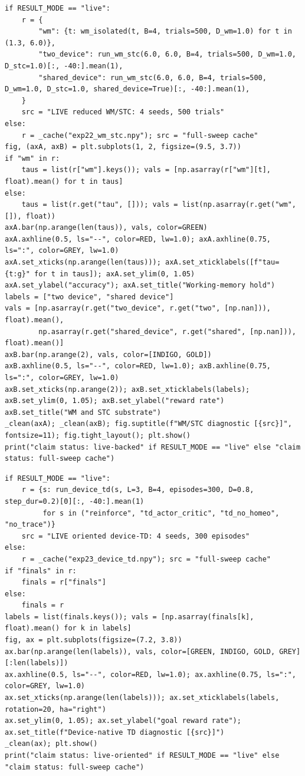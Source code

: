 \begin{lstlisting}[caption={06\_extensions.ipynb code cell 4},label={lst:mrl-nb-06-extensions-4}]
if RESULT_MODE == "live":
    r = {
        "wm": {t: wm_isolated(t, B=4, trials=500, D_wm=1.0) for t in (1.3, 6.0)},
        "two_device": run_wm_stc(6.0, 6.0, B=4, trials=500, D_wm=1.0, D_stc=1.0)[:, -40:].mean(1),
        "shared_device": run_wm_stc(6.0, 6.0, B=4, trials=500, D_wm=1.0, D_stc=1.0, shared_device=True)[:, -40:].mean(1),
    }
    src = "LIVE reduced WM/STC: 4 seeds, 500 trials"
else:
    r = _cache("exp22_wm_stc.npy"); src = "full-sweep cache"
fig, (axA, axB) = plt.subplots(1, 2, figsize=(9.5, 3.7))
if "wm" in r:
    taus = list(r["wm"].keys()); vals = [np.asarray(r["wm"][t], float).mean() for t in taus]
else:
    taus = list(r.get("tau", [])); vals = list(np.asarray(r.get("wm", []), float))
axA.bar(np.arange(len(taus)), vals, color=GREEN)
axA.axhline(0.5, ls="--", color=RED, lw=1.0); axA.axhline(0.75, ls=":", color=GREY, lw=1.0)
axA.set_xticks(np.arange(len(taus))); axA.set_xticklabels([f"tau={t:g}" for t in taus]); axA.set_ylim(0, 1.05)
axA.set_ylabel("accuracy"); axA.set_title("Working-memory hold")
labels = ["two device", "shared device"]
vals = [np.asarray(r.get("two_device", r.get("two", [np.nan])), float).mean(),
        np.asarray(r.get("shared_device", r.get("shared", [np.nan])), float).mean()]
axB.bar(np.arange(2), vals, color=[INDIGO, GOLD])
axB.axhline(0.5, ls="--", color=RED, lw=1.0); axB.axhline(0.75, ls=":", color=GREY, lw=1.0)
axB.set_xticks(np.arange(2)); axB.set_xticklabels(labels); axB.set_ylim(0, 1.05); axB.set_ylabel("reward rate")
axB.set_title("WM and STC substrate")
_clean(axA); _clean(axB); fig.suptitle(f"WM/STC diagnostic [{src}]", fontsize=11); fig.tight_layout(); plt.show()
print("claim status: live-backed" if RESULT_MODE == "live" else "claim status: full-sweep cache")
\end{lstlisting}

\begin{lstlisting}[caption={06\_extensions.ipynb code cell 5},label={lst:mrl-nb-06-extensions-5}]
if RESULT_MODE == "live":
    r = {s: run_device_td(s, L=3, B=4, episodes=300, D=0.8, step_dur=0.2)[0][:, -40:].mean(1)
         for s in ("reinforce", "td_actor_critic", "td_no_homeo", "no_trace")}
    src = "LIVE oriented device-TD: 4 seeds, 300 episodes"
else:
    r = _cache("exp23_device_td.npy"); src = "full-sweep cache"
if "finals" in r:
    finals = r["finals"]
else:
    finals = r
labels = list(finals.keys()); vals = [np.asarray(finals[k], float).mean() for k in labels]
fig, ax = plt.subplots(figsize=(7.2, 3.8))
ax.bar(np.arange(len(labels)), vals, color=[GREEN, INDIGO, GOLD, GREY][:len(labels)])
ax.axhline(0.5, ls="--", color=RED, lw=1.0); ax.axhline(0.75, ls=":", color=GREY, lw=1.0)
ax.set_xticks(np.arange(len(labels))); ax.set_xticklabels(labels, rotation=20, ha="right")
ax.set_ylim(0, 1.05); ax.set_ylabel("goal reward rate"); ax.set_title(f"Device-native TD diagnostic [{src}]")
_clean(ax); plt.show()
print("claim status: live-oriented" if RESULT_MODE == "live" else "claim status: full-sweep cache")
\end{lstlisting}

